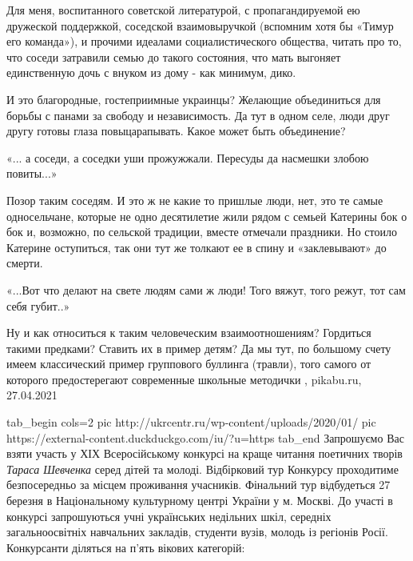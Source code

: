 Для меня, воспитанного советской литературой, с пропагандируемой ею дружеской
поддержкой, соседской взаимовыручкой (вспомним хотя бы «Тимур его команда»), и
прочими идеалами социалистического общества, читать про то, что соседи
затравили семью до такого состояния, что мать выгоняет единственную дочь с
внуком из дому - как минимум, дико.

И это благородные, гостеприимные украинцы? Желающие объединиться для борьбы с
панами за свободу и независимость. Да тут в одном селе, люди друг другу готовы
глаза повыцарапывать. Какое может быть объединение?

\obeycr
«... а соседи, а соседки
уши прожужжали.
Пересуды да насмешки
злобою повиты...»
\restorecr

Позор таким соседям. И это ж не какие то пришлые люди, нет, это те самые
односельчане, которые не одно десятилетие жили рядом с семьей Катерины бок о
бок и, возможно, по сельской традиции, вместе отмечали праздники. Но стоило
Катерине оступиться, так они тут же толкают ее в спину и «заклевывают» до
смерти.

«...Вот что делают на свете
людям сами ж люди!
Того вяжут, того режут,
тот сам себя губит..»

Ну и как относиться к таким человеческим взаимоотношениям?  Гордиться такими
предками? Ставить их в пример детям? Да мы тут, по большому счету имеем
классический пример группового буллинга (травли), того самого от которого
предостерегают современные школьные методички
, pikabu.ru, 27.04.2021


\ifcmt
  tab_begin cols=2
     pic http://ukrcentr.ru/wp-content/uploads/2020/01/%
     pic https://external-content.duckduckgo.com/iu/?u=https%
  tab_end
\fi
Запрошуємо Вас взяти участь у ХІХ Всеросійському конкурсі на краще читання
поетичних творів \emph{Тараса Шевченка} серед дітей та молоді.
Відбірковий тур Конкурсу проходитиме безпосередньо за місцем проживання учасників.
Фінальний тур відбудеться 27 березня в Національному культурному центрі України у м. Москві.
До участі в конкурсі запрошуються учні українських недільних шкіл, середніх
загальноосвітніх навчальних закладів, студенти вузів, молодь із регіонів Росії.
Конкурсанти діляться на п'ять вікових категорій:

